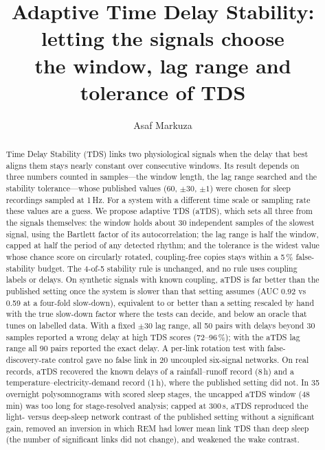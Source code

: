 \documentclass[11pt,a4paper]{article}
\title{Adaptive Time Delay Stability: letting the signals choose\\the window, lag range and tolerance of TDS}
\author{Asaf Markuza}
\date{}
\begin{document}
\maketitle

\begin{abstract}
Time Delay Stability (TDS) links two physiological signals when the delay that best aligns them stays nearly constant over consecutive windows. Its result depends on three numbers counted in samples---the window length, the lag range searched and the stability tolerance---whose published values (60, $\pm30$, $\pm1$) were chosen for sleep recordings sampled at 1\,Hz. For a system with a different time scale or sampling rate these values are a guess. We propose adaptive TDS (aTDS), which sets all three from the signals themselves: the window holds about 30 independent samples of the slowest signal, using the Bartlett factor of its autocorrelation; the lag range is half the window, capped at half the period of any detected rhythm; and the tolerance is the widest value whose chance score on circularly rotated, coupling-free copies stays within a 5\,\% false-stability budget. The 4-of-5 stability rule is unchanged, and no rule uses coupling labels or delays. On synthetic signals with known coupling, aTDS is far better than the published setting once the system is slower than that setting assumes (AUC 0.92 vs 0.59 at a four-fold slow-down), equivalent to or better than a setting rescaled by hand with the true slow-down factor where the tests can decide, and below an oracle that tunes on labelled data. With a fixed $\pm30$ lag range, all 50 pairs with delays beyond 30 samples reported a wrong delay at high TDS scores (72--96\,\%); with the aTDS lag range all 90 pairs reported the exact delay. A per-link rotation test with false-discovery-rate control gave no false link in 20 uncoupled six-signal networks. On real records, aTDS recovered the known delays of a rainfall--runoff record (8\,h) and a temperature--electricity-demand record (1\,h), where the published setting did not. In 35 overnight polysomnograms with scored sleep stages, the uncapped aTDS window (48\,min) was too long for stage-resolved analysis; capped at 300\,s, aTDS reproduced the light- versus deep-sleep network contrast of the published setting without a significant gain, removed an inversion in which REM had lower mean link TDS than deep sleep (the number of significant links did not change), and weakened the wake contrast.
\end{abstract}
\end{document}
